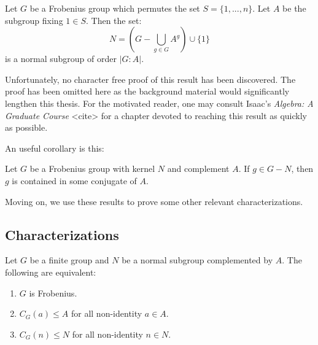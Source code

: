 \documentclass[main.tex]{subfiles}
\begin{document}
\begin{theorem}[Frobenius]
Let $G$ be a Frobenius group which permutes the set $S = \{1,...,n\}$. Let $A$ be the subgroup fixing $1 \in S$. Then the set:
$$N = (G - \bigcup_{g \in G} A^g) \cup \{1\}$$
is a normal subgroup of order $|G : A|$.
\end{theorem}

Unfortunately, no character free proof of this result has been discovered. The proof has been omitted here as the background material would significantly lengthen this thesis. For the motivated reader, one may consult Isaac's \emph{Algebra: A Graduate Course} <cite> for a chapter devoted to reaching this result as quickly as possible.

An useful corollary is this:

\begin{corollary}\label{frobeniuscorollary}
Let $G$ be a Frobenius group with kernel $N$ and complement $A$. If $g \in G - N$, then $g$ is contained in some conjugate of $A$.
\end{corollary}

Moving on, we use these results to prove some other relevant characterizations.

\hss

\subsection{Characterizations}

\hss

\begin{lemma}\label{frobeniuscentralizers}
Let $G$ be a finite group and $N$ be a normal subgroup complemented by $A$. The following are equivalent:
\begin{enumerate}
	\item $G$ is Frobenius.
	\item $C_G(a) \le A$ for all non-identity $a \in A$.
	\item $C_G(n) \le N$ for all non-identity $n \in N$.
\end{enumerate}
\end{lemma}
\end{document}
